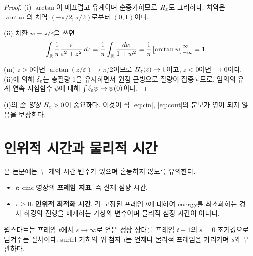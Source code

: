 \begin{proof}
(i) $\arctan$이 매끄럽고 유계이며 순증가하므로 $H_\varepsilon$도 그러하다. 치역은
$\arctan$의 치역 $(-\pi/2,\pi/2)$로부터 $(0,1)$이다.

(ii) 치환 $w = z/\varepsilon$을 쓰면
\[
  \int_{\mathbb{R}} \frac{1}{\pi}\frac{\varepsilon}{\varepsilon^2+z^2}\,dz
  = \frac{1}{\pi}\int_{\mathbb{R}} \frac{dw}{1+w^2}
  = \frac{1}{\pi}\bigl[\arctan w\bigr]^{\infty}_{-\infty} = 1.
\]

(iii) $z>0$이면 $\arctan(z/\varepsilon)\to\pi/2$이므로 $H_\varepsilon(z)\to1$이고, $z<0$이면
$\to 0$이다. (ii)에 의해 $\delta_\varepsilon$는 총질량 1을 유지하면서 원점 근방으로 질량이
집중되므로, 임의의 유계 연속 시험함수 $\psi$에 대해 $\int \delta_\varepsilon \psi \to \psi(0)$이다.
\end{proof}

(i)의 \emph{순 양성} $H_\varepsilon > 0$이 중요하다. 이것이 식 \eqref{eq:cin}, \eqref{eq:cout}의
분모가 영이 되지 않음을 보장한다.


\section{인위적 시간과 물리적 시간}

본 논문에는 두 개의 시간 변수가 있으며 혼동하지 않도록 유의한다.

\begin{itemize}[leftmargin=2em]
  \item $t$: cine 영상의 \textbf{프레임 지표}, 즉 실제 심장 시간.
  \item $s \ge 0$: \textbf{인위적 최적화 시간}. 각 고정된 프레임 $t$에 대하여 energy를
  최소화하는 경사 하강의 진행을 매개하는 가상의 변수이며 물리적 심장 시간이 아니다.
\end{itemize}

웜스타트는 프레임 $t$에서 $s\to\infty$로 얻은 정상 상태를 프레임 $t+1$의 $s=0$
초기값으로 넘겨주는 절차이다. surfel 기하의 위 첨자 $t$는 언제나 물리적 프레임을
가리키며 $s$와 무관하다.
